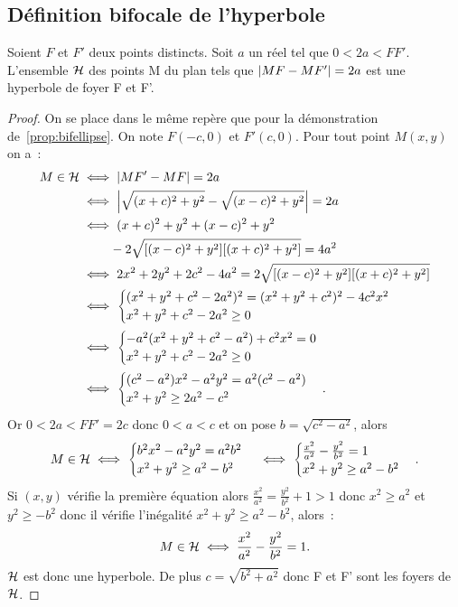\subsection{Définition bifocale de l'hyperbole}
\begin{prop}
  Soient $F$ et $F'$ deux points distincts. Soit $a$ un réel tel que $0<2a<FF'$. L'ensemble $\mathcal{H}$ des points M du plan tels que $\left\lvert MF-MF'\right\rvert=2a$ est une hyperbole de foyer F et F'.
\end{prop}
\begin{proof}
  On se place dans le même repère que pour la démonstration de~\ref{prop:bifellipse}. On note $F(-c,0)$ et $F'(c,0)$. Pour tout point $M(x,y)$  on a~:
  \begin{align}
    M \in \mathcal{H} & \iff \left\lvert MF'-MF\right\rvert=2a \\
    & \iff \left\lvert\sqrt{(x+c)^2+y^2}-\sqrt{(x-c)^2+y^2}\right\rvert=2a \\
    & \iff (x+c)^2 +y^2 + (x-c)^2 + y^2 \notag \\ & \phantom{\iff} -2\sqrt{[(x-c)^2+y^2][(x+c)^2+y^2]}=4a^2\\
    & \iff 2x^2+2y^2+2c^2-4a^2=2\sqrt{[(x-c)^2+y^2][(x+c)^2+y^2]}\\
    & \iff \begin{cases}(x^2+y^2+c^2-2a^2)^2=(x^2+y^2+c^2)^2-4c^2x^2 \\ x^2+y^2+c^2-2a^2 \geq 0\end{cases}\\
    & \iff \begin{cases}-a^2(x^2+y^2+c^2-a^2)+c^2x^2=0 \\ x^2+y^2+c^2-2a^2 \geq 0\end{cases}\\
    & \iff \begin{cases}(c^2-a^2)x^2 - a^2y^2=a^2(c^2-a^2) \\ x^2+y^2 \geq 2a^2-c^2\end{cases}.
  \end{align}
  Or $0<2a<FF'=2c$ donc $0<a<c$ et on pose $b=\sqrt{c^2-a^2}$, alors
  \begin{equation}
    M \in \mathcal{H} \iff \begin{cases}b^2x^2 - a^2y^2=a^2b^2 \\ x^2+y^2 \geq a^2-b^2\end{cases}\iff\begin{cases}\frac{x^2}{a^2} - \frac{y^2}{b^2}=1 \\ x^2+y^2 \geq a^2-b^2\end{cases}.
\end{equation}
Si $(x,y)$ vérifie la première équation alors $\frac{x^2}{a^2}= \frac{y^2}{b^2}+1>1$ donc $x^2\geq a^2$ et $y^2\geq -b^2$ donc il vérifie l'inégalité $x^2+y^2\geq a^2-b^2$, alors~:
\begin{equation}
  M \in \mathcal{H} \iff \frac{x^2}{a^2} - \frac{y^2}{b^2} =1.
\end{equation}
$\mathcal{H}$ est donc une hyperbole. De plus $c=\sqrt{b^2+a^2}$ donc F et F' sont les foyers de $\mathcal{H}$.
\end{proof}
